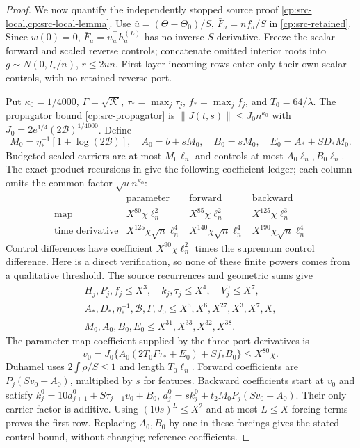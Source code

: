 \begin{proof}
We now quantify the independently stopped source proof
\cref{cp:src-local,cp:src-local-lemma}. Use
$\bar u=(\Theta-\Theta_0)/S$, $\bar F_a=nf_a/S$ in
\eqref{cp:src-retained}. Since $w(0)=0$,
$\bar F_a=\bar u_w^\top h_a^{(L)}$ has no inverse-$S$ derivative.
Freeze the scalar forward and scaled reverse controls; concatenate omitted
interior roots into $g\sim N(0,I_r/n)$, $r\le2un$.
First-layer incoming rows enter only their own scalar controls, with no
retained reverse port.

Put $\kappa_0=1/4000$, $\Gamma=\sqrt{\mathcal K}$,
$\tau_*=\max_j\tau_j$, $f_*=\max_j f_j$, and $T_0=64/\lambda$.
The propagator bound \eqref{cp:src-propagator} is
$\|J(t,s)\|\le J_0n^{\kappa_0}$ with
$J_0=2e^{1/4}(2\mathcal B)^{1/4000}$.
Define
\[
M_0=\eta_*^{-1}[1+\log(2\mathcal B)],\quad
A_0=b+sM_0,\quad B_0=sM_0,\quad E_0=A_*+SD_*M_0.
\]
Budgeted scaled carriers are at most $M_0\ell_n$ and controls at most
$A_0\ell_n,B_0\ell_n$.
The exact product recursions in 
give the following coefficient ledger; each column omits the common
factor $\sqrt u n^{\kappa_0}$:
\[
\begin{array}{c|ccc}
 &\text{parameter}&\text{forward}&\text{backward}\\ \hline
\text{map}&X^{80}\chi\ell_n^2&X^{85}\chi\ell_n^2&
                              X^{125}\chi\ell_n^3\\
\text{time derivative}&X^{125}\chi\sqrt n\ell_n^4&
 X^{140}\chi\sqrt n\ell_n^4&X^{190}\chi\sqrt n\ell_n^4
\end{array}
\]
Control differences have coefficient $X^{90}\chi\ell_n^2$ times
the supremum control difference. Here is a direct verification,
so none of these finite powers comes from a qualitative threshold.
The source recurrences and geometric sums give
\[
\begin{gathered}
H_j,P_j,f_j\le X^3,\quad k_j,\tau_j\le X^4,\quad V_j^0\le X^7,\\
A_*,D_*,\eta_*^{-1},\mathcal B,\Gamma,J_0
 \le X^5,X^6,X^{27},X^3,X^7,X,\\
M_0,A_0,B_0,E_0\le X^{31},X^{33},X^{32},X^{38}.
\end{gathered}
\]
The parameter map coefficient supplied by the three port derivatives is
\begin{equation}
v_0=J_0\{A_0(2T_0\Gamma\tau_*+E_0)+Sf_*B_0\}
       \le X^{80}\chi.
\label{cp:poly:eq:map-coefficients}
\end{equation}
Duhamel uses $2\int\rho/S\le1$ and length $T_0\ell_n$.
Forward coefficients are $P_j(Sv_0+A_0)$, multiplied by $s$
for features. Backward coefficients start at $v_0$ and satisfy
$k_j^0=10d_{j+1}^0+S\tau_{j+1}v_0+B_0$,
$d_j^0=sk_j^0+t_2M_0P_j(Sv_0+A_0)$.
Their only carrier factor is additive. Using
$(10s)^L\le X^2$ and at most $L\le X$ forcing terms proves
the first row. Replacing $A_0,B_0$ by one in these forcings gives
the stated control bound, without changing reference coefficients.


\end{proof}
